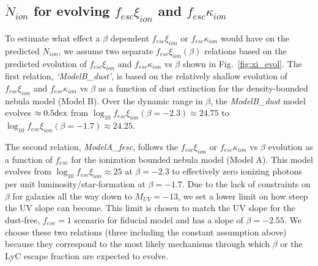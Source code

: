 \subsection{$\dot{N}_{ion}$ for evolving $f_{esc}\xi_{ion}$ and $f_{esc}\kappa_{ion}$}

To estimate what effect a $\beta$ dependent $f_{esc}\xi_{ion}$ or $f_{esc}\kappa_{ion}$ would have on the predicted $\dot{N}_{ion}$, we assume two separate $f_{esc}\xi_{ion}(\beta)$ relations based on the predicted evolution of $f_{esc}\xi_{ion}$ and $f_{esc}\kappa_{ion}$ vs $\beta$ shown in Fig.~\ref{fig:xi_evol}. The first relation,  \emph{`ModelB\_dust'}, is based on the relatively shallow evolution of $f_{esc}\xi_{ion}$ and $f_{esc}\kappa_{ion}$ vs $\beta$ as a function of dust extinction for the density-bounded nebula model (Model B). Over the dynamic range in $\beta$, the \emph{ModelB\_dust} model evolves $\approx 0.5\/\rm{dex}$ from $\log_{10}f_{esc}\xi_{ion}(\beta = -2.3) \approx 24.75$ to $\log_{10}f_{esc}\xi_{ion}(\beta = -1.7) \approx 24.25$. 

The second relation, \emph{ModelA\_fesc}, follows the $f_{esc}\xi_{ion}$ or $f_{esc}\kappa_{ion}$ vs $\beta$ evolution as a function of $f_{esc}$ for the ionization bounded nebula model (Model A). This model evolves from $\log_{10}f_{esc}\xi_{ion} \approx 25$ at $\beta = -2.3$ to effectively zero ionizing photons per unit luminosity/star-formation at $\beta = -1.7$. Due to the lack of constraints on $\beta$ for galaxies all the way down to $M_{UV} = -13$, we set a lower limit on how steep the UV slope can become. This limit is chosen to match the UV slope for the dust-free, $f_{esc} = 1$ scenario for fiducial model and has a slope of $\beta = -2.55$. We choose these two relations (three including the constant assumption above) because they correspond to the most likely mechanisms through which $\beta$ or the LyC escape fraction are expected to evolve. 

